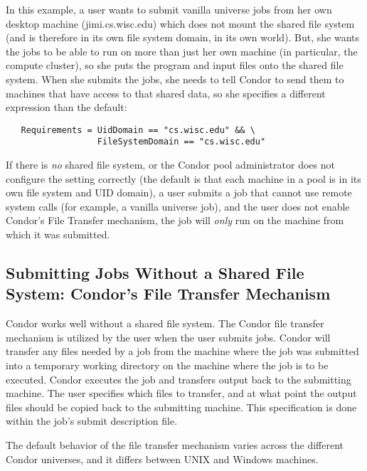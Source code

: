 In this example,
a user wants to submit vanilla universe jobs from her own desktop
machine (jimi.cs.wisc.edu) which does not mount the shared file system
(and is therefore in its own file system domain, in its own world).
But, she wants the jobs to be able to run on more than just her own
machine (in particular, the compute cluster), so she puts the program
and input files onto the shared file system.
When she submits the jobs, she needs to tell Condor to send them to
machines that have access to that shared data, so she specifies a
different  expression than the default:
\begin{verbatim}
   Requirements = UidDomain == "cs.wisc.edu" && \
                  FileSystemDomain == "cs.wisc.edu"
\end{verbatim}

\Warn If there is \emph{no} shared file system, or the Condor pool
administrator does not configure the \AdAttr{FileSystemDomain}
setting correctly (the default is that each machine in a pool is in
its own file system and UID domain), a user submits a job that cannot
use remote system calls (for example, a vanilla universe job), and the
user does not enable Condor's File Transfer mechanism, the job will
\emph{only} run on the machine from which it was submitted.


\subsection{\label{sec:file-transfer}
Submitting Jobs Without a Shared File System:
Condor's File Transfer Mechanism} 

Condor works well without a shared file system.
The Condor file transfer mechanism is utilized by the user
when the user submits jobs.
Condor will transfer any files needed by a job from
the machine where the job was submitted into a
temporary working directory on the machine where the
job is to be executed.
Condor executes the job
and transfers output back to the submitting machine.
The user specifies which files to transfer,
and at what point the output files should be copied back to the
submitting machine.
This specification is done within the job's submit description file.

The default behavior of the file transfer mechanism
varies across the
different Condor universes, and it differs between UNIX and Windows machines.

